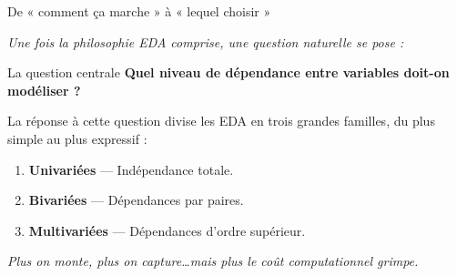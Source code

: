 \documentclass[10pt,aspectratio=169]{beamer}
\begin{document}
\begin{frame}{De « comment ça marche » à « lequel choisir »}
\begin{center}
\textit{Une fois la philosophie EDA comprise, une question naturelle se pose :}
\end{center}

\vspace{0.3cm}
\begin{block}{La question centrale}
\centering\large
\textbf{Quel niveau de dépendance entre variables doit-on modéliser ?}
\end{block}

\vspace{0.3cm}
La réponse à cette question divise les EDA en trois grandes familles, du plus simple au plus expressif :
\begin{enumerate}
  \item \textcolor{successgreen}{\textbf{Univariées}} — Indépendance totale.
  \item \textcolor{accentorange}{\textbf{Bivariées}} — Dépendances par paires.
  \item \textcolor{dangerred}{\textbf{Multivariées}} — Dépendances d'ordre supérieur.
\end{enumerate}

\vspace{0.3cm}
\centering
\textit{Plus on monte, plus on capture\ldots mais plus le coût computationnel grimpe.}
\end{frame}
\end{document}

